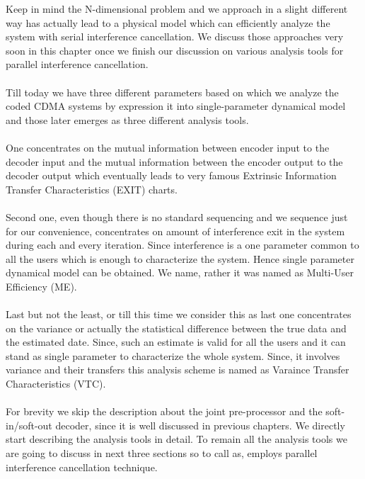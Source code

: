 Keep in mind the N-dimensional problem and we approach in a slight different way has actually lead to a physical model which can efficiently analyze the system with serial interference cancellation. We discuss those approaches very soon in this chapter once we finish our discussion on various analysis tools for parallel interference cancellation. \\ \\
Till today we have three different parameters based on which we analyze the coded CDMA systems by expression it into single-parameter dynamical model and those later emerges as three different analysis tools.\\ \\
One concentrates on the mutual information between encoder input to the decoder input and the mutual information between the encoder output to the decoder output which eventually leads to very famous Extrinsic Information Transfer Characteristics (EXIT) charts. \\ \\
Second one, even though there is no standard sequencing and we sequence just for our convenience, concentrates on amount of interference exit in the system during each and every iteration. Since interference is a one parameter common to all the users which is enough to characterize the system. Hence single parameter dynamical model can be obtained. We name, rather it was named as Multi-User Efficiency (ME). \\ \\
Last but not the least, or till this time we consider this as last one concentrates on the variance or actually the statistical difference between the true data and the estimated date. Since, such an estimate is valid for all the users and it can stand as single parameter to characterize the whole system. Since, it involves variance and their transfers this analysis scheme is named as Varaince Transfer Characteristics (VTC). \\ \\
For brevity we skip the description about the joint pre-processor and the soft-in/soft-out decoder, since it is well discussed in previous chapters. We directly start describing the analysis tools in detail. To remain all the analysis tools we are going to discuss in next three sections so to call as, employs parallel interference cancellation technique.
